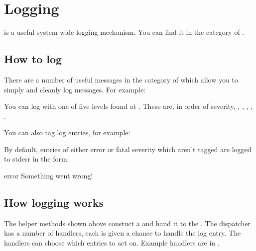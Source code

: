 \documentclass[letterpaper,10pt,english]{sphinxmanual}
\begin{document}
\section{Logging}
\label{\detokenize{logging:logging}}\label{\detokenize{logging::doc}}
 is a useful system-wide logging mechanism. You can find it in the  category of .


\subsection{How to log}
\label{\detokenize{logging:how-to-log}}
There are a number of useful messages in the  category of  which allow you to simply and cleanly log messages. For example:

\begin{sphinxVerbatim}[commandchars=\\\{\}]
  
\end{sphinxVerbatim}

You can log with one of five levels found at . These are, in order of severity, , , , , .

You can also tag log entries, for example:

\begin{sphinxVerbatim}[commandchars=\\\{\}]
    
\end{sphinxVerbatim}

By default, entries of either error or fatal severity which aren't tagged are logged to stderr in the form:

\begin{sphinxVerbatim} error \PYGZhy{}\PYGZhy{} Something went wrong!
\end{sphinxVerbatim}


\subsection{How logging works}
\label{\detokenize{logging:how-logging-works}}
The helper methods shown above constuct a  and hand it to the . The dispatcher has a number of handlers, each is given a chance to handle the log entry. The handlers can choose which entries to act on. Example handlers are in .
\end{document}
